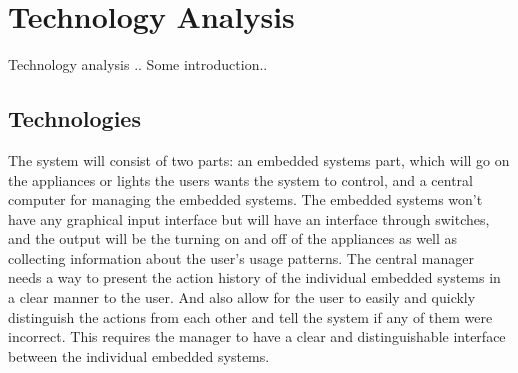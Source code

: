 \section{Technology Analysis}
\label{chap:Technology Analysis}
Technology analysis    .. Some introduction..
\subsection{Technologies}
\label{sub:Technologies}
The system will consist of two parts: an embedded systems part, which will go on
the appliances or lights the users wants the system to control, and a central
computer for managing the embedded systems. The embedded systems won't have any graphical input interface but will have an interface through switches, and the output will be the turning on and off of the appliances
as well as collecting information about the user's usage patterns.
The central manager needs a way to present the action history of the individual embedded systems in a clear manner to the user.
And also allow for the user to easily and quickly distinguish the actions from each other and tell the system if any of them were incorrect.
This requires the manager to have a clear and distinguishable interface between the individual embedded systems.
